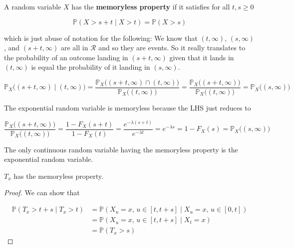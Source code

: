\documentclass{article}
\begin{document}
      \begin{definition}
        A random variable $X$ has the \textbf{memoryless property} if it satisfies for all $t, s \geq 0$ 

          \[\mathbb{P}(X > s + t \mid X > t) = \mathbb{P}(X > s)\]

        which is just abuse of notation for the following: We know that $(t, \infty)$, $(s, \infty)$, and $(s + t, \infty)$ are all in $\mathcal{R}$ and so they are events. So it really translates to the probability of an outcome landing in $(s + t, \infty)$ given that it lands in $(t, \infty)$ is equal the probability of it landing in $(s, \infty)$. 

          \[\mathbb{P}_X \big( (s + t, \infty) \mid (t, \infty) \big) = \frac{\mathbb{P}_X \big( (s + t, \infty) \cap (t, \infty) \big)}{\mathbb{P}_X \big( (t, \infty) \big)} = \frac{\mathbb{P}_X \big( (s + t, \infty) \big)}{\mathbb{P}_X \big( (t, \infty) \big)} = \mathbb{P}_X \big( (s, \infty) \big)\]
      \end{definition}

      The exponential random variable is memoryless because the LHS just reduces to 

        \[\frac{\mathbb{P}_X \big( (s + t, \infty) \big)}{\mathbb{P}_X \big( (t, \infty) \big)} = \frac{1 - F_X (s + t)}{1 - F_X (t)} = \frac{e^{-\lambda(s + t)}}{e^{-\lambda t}} = e^{-\lambda s} = 1 - F_X (s) = \mathbb{P}_X \big( (s, \infty) \big) \]

      \begin{theorem}
        The only continuous random variable having the memoryless property is the exponential random variable. 
      \end{theorem}

      \begin{theorem}
        $T_x$ has the memoryless property. 
      \end{theorem}
      \begin{proof}
        We can show that 

        \begin{align*}
          \mathbb{P}(T_x > t + s \mid T_x > t) & = \mathbb{P}(X_u = x, \, u \in [t, t + s] \mid X_u = x, \, u \in [0, t]) \\
          & = \mathbb{P}(X_u = x, \, u \in [t, t + s] \mid X_t = x) \\
          & = \mathbb{P}(T_x > s) 
        \end{align*}
      \end{proof}
\end{document}
